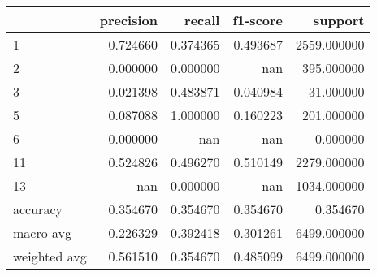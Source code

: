 \begin{tabular}{lrrrr}
\toprule
 & precision & recall & f1-score & support \\
\midrule
1 & 0.724660 & 0.374365 & 0.493687 & 2559.000000 \\
2 & 0.000000 & 0.000000 & nan & 395.000000 \\
3 & 0.021398 & 0.483871 & 0.040984 & 31.000000 \\
5 & 0.087088 & 1.000000 & 0.160223 & 201.000000 \\
6 & 0.000000 & nan & nan & 0.000000 \\
11 & 0.524826 & 0.496270 & 0.510149 & 2279.000000 \\
13 & nan & 0.000000 & nan & 1034.000000 \\
accuracy & 0.354670 & 0.354670 & 0.354670 & 0.354670 \\
macro avg & 0.226329 & 0.392418 & 0.301261 & 6499.000000 \\
weighted avg & 0.561510 & 0.354670 & 0.485099 & 6499.000000 \\
\bottomrule
\end{tabular}

